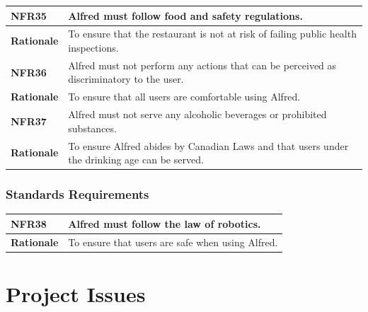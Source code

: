 \documentclass [11pt]{article}
\begin{document}
\begin{longtable}{| p{ } | p{ } | }\hline 
\rowcolor{tableCell}\textbf{NFR35} & Alfred must follow food and safety regulations. \\ \hline
\textbf{Rationale} & To ensure that the restaurant is not at risk of failing public health inspections.\\ \hline
\rowcolor{tableCell}\textbf{NFR36} & Alfred must not perform any actions that can be perceived as discriminatory to the user. \\ \hline
\textbf{Rationale} & To ensure that all users are comfortable using Alfred.\\ \hline 
\rowcolor{tableCell}\textbf{NFR37} & Alfred must not serve any alcoholic beverages or prohibited substances. \\ \hline
\textbf{Rationale} & To ensure Alfred abides by Canadian Laws and that users under the drinking age can be served.\\ \hline 
\end{longtable}

\subsubsection{Standards Requirements }

\begin{longtable}{| p{ } | p{ } | }\hline 
\rowcolor{tableCell}\textbf{NFR38} & Alfred must follow the law of robotics. \\ \hline
\textbf{Rationale} & To ensure that users are safe when using Alfred.\\ \hline 
\end{longtable}


\section {Project Issues} 

\end{document}
